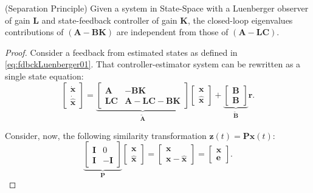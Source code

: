 \documentclass[a4paper,11pt]{book}
\numberwithin{figure}{chapter}
\numberwithin{equation}{chapter}
\numberwithin{table}{chapter}
\newtheorem{theorem}{Theorem}[chapter]
\theoremstyle{definition}
\newcounter{boxed-theorem}
\newenvironment{boxed-theorem}[1]
{\begin{shaded} \begin{theorem}{#1}}
{\end{theorem} \end{shaded}}
\newcounter{boxed-definition}
\begin{document}
\begin{boxed-theorem}{(Separation Principle)} \label{th:separationPrinciple}
    Given a system in State-Space with a Luenberger observer of gain $\bm{L}$ and state-feedback controller of gain $\bm{K}$, the closed-loop eigenvalues contributions of $(\bm{A} - \bm{B}\bm{K})$ are independent from those of $(\bm{A} - \bm{L}\bm{C})$.
\end{boxed-theorem}

\begin{proof}
    Consider a feedback from estimated states as defined in \eqref{eq:fdbckLuenberger01}. That controller-estimator system can be rewritten as a single state equation:
    \begin{equation}
    \begin{bmatrix} \dot{\bm{x}} \\ \dot{\hat{\bm{x}}}  \end{bmatrix}
    =
    \underbrace{\begin{bmatrix}
        \bm{A} & - \bm{B} \bm{K} \\
        \bm{L} \bm{C} & \bm{A} - \bm{L} \bm{C} - \bm{B} \bm{K}
    \end{bmatrix}}_{\tilde{\bm{A}}} \begin{bmatrix} \bm{x} \\ \hat{\bm{x}} \end{bmatrix}
    +
    \underbrace{\begin{bmatrix} \bm{B} \\ \bm{B} \end{bmatrix}}_{\tilde{\bm{B}}} \bm{r}
.\end{equation} 

Consider, now, the following similarity transformation $\bm{z}(t) = \bm{P} \bm{x}(t)$:
\begin{equation}
    \underbrace{\begin{bmatrix}
        \bm{I} & 0 \\ \bm{I} & -\bm{I}
    \end{bmatrix}}_{\bm{P}} \begin{bmatrix}
        \bm{x} \\ \hat{\bm{x}}
    \end{bmatrix} = \begin{bmatrix}
        \bm{x} \\ \bm{x} - \hat{\bm{x}}
    \end{bmatrix} = \begin{bmatrix}
        \bm{x} \\ \bm{e}
    \end{bmatrix} 
.\end{equation}


\end{proof}
\end{document}

